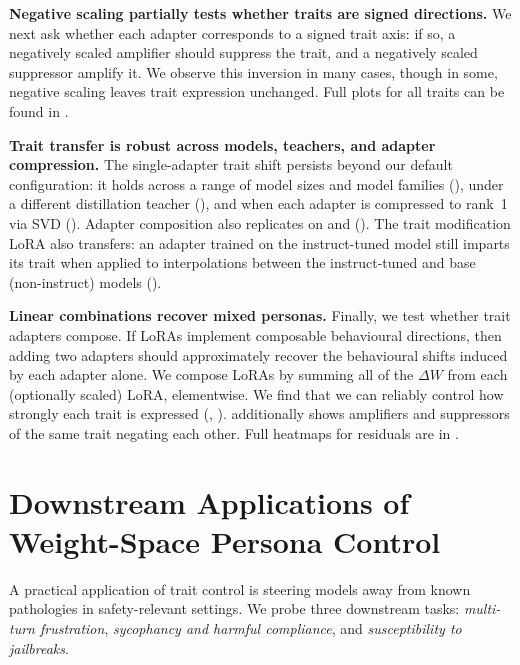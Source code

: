 \textbf{Negative scaling partially tests whether traits are signed directions.} We next ask whether each adapter corresponds to a signed trait axis: if so, a negatively scaled amplifier should suppress the trait, and a negatively scaled suppressor amplify it. We observe this inversion in many cases, though in some, negative scaling leaves trait expression unchanged. Full plots for all traits can be found in .

\textbf{Trait transfer is robust across models, teachers, and adapter compression.} The single-adapter trait shift persists beyond our default configuration: it holds across a range of model sizes and model families (), under a different distillation teacher (), and when each adapter is compressed to rank~1 via SVD (). Adapter composition also replicates on \GemmaThreeSizeTwelveBIT and \GemmaThreeSizeTwentySevenBIT (). The trait modification LoRA also transfers: an adapter trained on the instruct-tuned model still imparts its trait when applied to interpolations between the instruct-tuned and base (non-instruct) models ().

\textbf{Linear combinations recover mixed personas.} Finally, we test whether trait adapters compose. If LoRAs implement composable behavioural directions, then adding two adapters should approximately recover the behavioural shifts induced by each adapter alone. We compose LoRAs by summing all of the $\Delta W$ from each (optionally scaled) LoRA, elementwise. We find that we can reliably control how strongly each trait is expressed (, ).  additionally shows amplifiers and suppressors of the same trait negating each other. Full heatmaps for residuals are in .

\section{Downstream Applications of Weight-Space Persona Control}
\label{sec:downstream}

A practical application of trait control is steering models away from known pathologies in safety-relevant settings. We probe three downstream tasks: \textit{multi-turn frustration}, \textit{sycophancy and harmful compliance}, and \textit{susceptibility to jailbreaks}.

